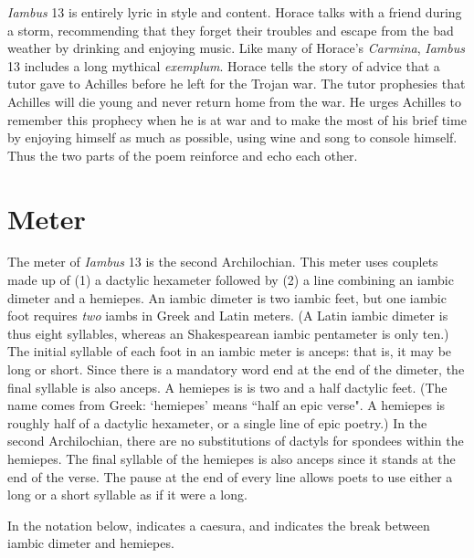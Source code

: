 \textit{Iambus} 13 is entirely lyric in style and content.  Horace talks with a friend during a storm, recommending that they forget their troubles and escape from the bad weather by drinking and enjoying music.  Like many of Horace's \textit{Carmina}, \textit{Iambus} 13 includes a long mythical \textit{exemplum}.  Horace tells the story of advice that a tutor gave to Achilles before he left for the Trojan war.  The tutor prophesies that Achilles will die young and never return home from the war.  He urges Achilles to remember this prophecy when he is at war and to make the most of his brief time by enjoying himself as much as possible, using wine and song to console himself.  Thus the two parts of the poem reinforce and echo each other.


\section*{Meter}

The meter of \textit{Iambus} 13 is the second Archilochian. This meter uses couplets made up of (1) a dactylic hexameter followed by (2) a line combining an iambic dimeter and a hemiepes.  An iambic dimeter is two iambic feet, but one iambic foot requires \textit{two} iambs in Greek and Latin meters.  (A Latin iambic dimeter is thus eight syllables, whereas an Shakespearean iambic pentameter is only ten.)  The initial syllable of each foot in an iambic meter is anceps: that is, it may be long or short.  Since there is a mandatory word end at the end of the dimeter, the final syllable is also anceps.  A hemiepes is is two and a half dactylic feet.  (The name comes from Greek: `hemiepes' means ``half an epic verse".  A hemiepes is roughly half of a dactylic hexameter, or a single line of epic poetry.)  In the second Archilochian, there are no substitutions of dactyls for spondees within the hemiepes.  The final syllable of the hemiepes is also anceps since it stands at the end of the verse.  The pause at the end of every line allows poets to use either a long or a short syllable as if it were a long.

In the notation below, \metra{\c} indicates a caesura, and \metra{\cc} indicates the break between iambic dimeter and hemiepes.\newline

\indent\metra{\m\mbb\m\mbb\m\c\mbb\m\mbb\m\mbb\m\mb}

\indent\indent\metra{\mb\m\b\m\mb\m\b\mb\cc\m\bb\m\bb\mb}\newline


